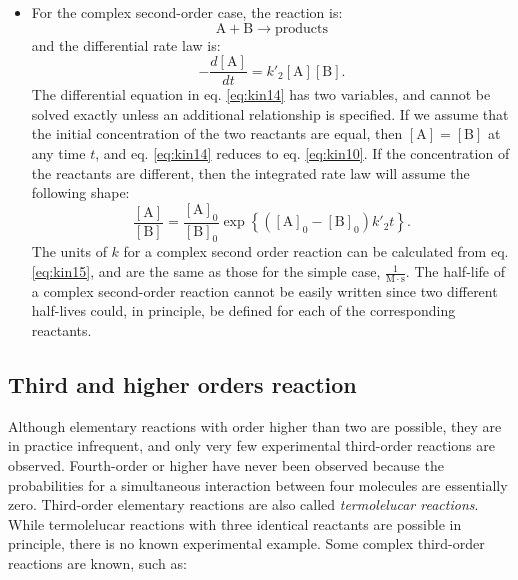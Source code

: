 \documentclass[
  9pt,
]{extbook}
\providecommand{\tightlist}{%
  \setlength{\itemsep}{0pt}\setlength{\parskip}{0pt}}
\theoremstyle{definition}
\theoremstyle{definition}
\theoremstyle{definition}
\theoremstyle{remark}
\begin{document}
\begin{itemize}
\tightlist
\item
  For the complex second-order case, the reaction is:
  \begin{equation}
  \mathrm{A}+\mathrm{B}\rightarrow \text{products}
  \end{equation}
  and the differential rate law is:
  \begin{equation}
  -\frac{d[\mathrm{A}]}{dt}=k'_2 [\mathrm{A}][\mathrm{B}].
  \label{eq:kin14}
  \end{equation}
  The differential equation in eq. \eqref{eq:kin14} has two variables, and cannot be solved exactly unless an additional relationship is specified. If we assume that the initial concentration of the two reactants are equal, then \([\mathrm{A}]=[\mathrm{B}]\) at any time \(t\), and eq. \eqref{eq:kin14} reduces to eq. \eqref{eq:kin10}. If the concentration of the reactants are different, then the integrated rate law will assume the following shape:
  \begin{equation}
  \frac{\mathrm{[A]}}{\mathrm{[B]}} = \frac{\mathrm{[A]_0}}{\mathrm{[B]_0}} \exp \left\{ \left(\mathrm{[A]_0} - \mathrm{[B]_0}\right) k'_2t \right\}.
  \label{eq:kin15}
  \end{equation}
  The units of \(k\) for a complex second order reaction can be calculated from eq. \eqref{eq:kin15}, and are the same as those for the simple case, \(\frac{1}{\mathrm{M}\cdot \mathrm{s}}\).
  The half-life of a complex second-order reaction cannot be easily written since two different half-lives could, in principle, be defined for each of the corresponding reactants.
\end{itemize}

\hypertarget{third-and-higher-orders-reaction}{%
\subsection{Third and higher orders reaction}\label{third-and-higher-orders-reaction}}

Although elementary reactions with order higher than two are possible, they are in practice infrequent, and only very few experimental third-order reactions are observed. Fourth-order or higher have never been observed because the probabilities for a simultaneous interaction between four molecules are essentially zero. Third-order elementary reactions are also called \emph{termolelucar reactions}. While termolelucar reactions with three identical reactants are possible in principle, there is no known experimental example. Some complex third-order reactions are known, such as:
\end{document}
